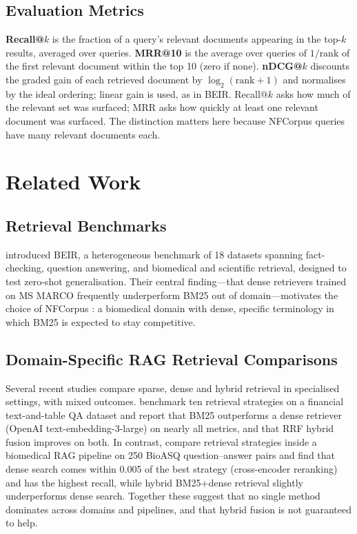 \documentclass[10pt,letterpaper,twocolumn]{article}
\begin{document}
\subsection{Evaluation Metrics}
\textbf{Recall@$k$} is the fraction of a query's relevant documents appearing in the top-$k$ results, averaged over queries. \textbf{MRR@10} is the average over queries of $1/\text{rank}$ of the first relevant document within the top 10 (zero if none). \textbf{nDCG@$k$} discounts the graded gain of each retrieved document by $\log_2(\text{rank}+1)$ and normalises by the ideal ordering; linear gain is used, as in BEIR. Recall@$k$ asks how much of the relevant set was surfaced; MRR asks how quickly at least one relevant document was surfaced. The distinction matters here because NFCorpus queries have many relevant documents each.

\section{Related Work}
\subsection{Retrieval Benchmarks}
\citet{thakur2021} introduced BEIR, a heterogeneous benchmark of 18 datasets spanning fact-checking, question answering, and biomedical and scientific retrieval, designed to test zero-shot generalisation. Their central finding---that dense retrievers trained on MS MARCO frequently underperform BM25 out of domain---motivates the choice of NFCorpus \citep{boteva2016}: a biomedical domain with dense, specific terminology in which BM25 is expected to stay competitive.

\subsection{Domain-Specific RAG Retrieval Comparisons}
Several recent studies compare sparse, dense and hybrid retrieval in specialised settings, with mixed outcomes. \citet{akarsu2026} benchmark ten retrieval strategies on a financial text-and-table QA dataset and report that BM25 outperforms a dense retriever (OpenAI text-embedding-3-large) on nearly all metrics, and that RRF hybrid fusion improves on both. In contrast, \citet{bal2026} compare retrieval strategies inside a biomedical RAG pipeline on 250 BioASQ question--answer pairs and find that dense search comes within 0.005 of the best strategy (cross-encoder reranking) and has the highest recall, while hybrid BM25+dense retrieval slightly underperforms dense search. Together these suggest that no single method dominates across domains and pipelines, and that hybrid fusion is not guaranteed to help.
\end{document}
